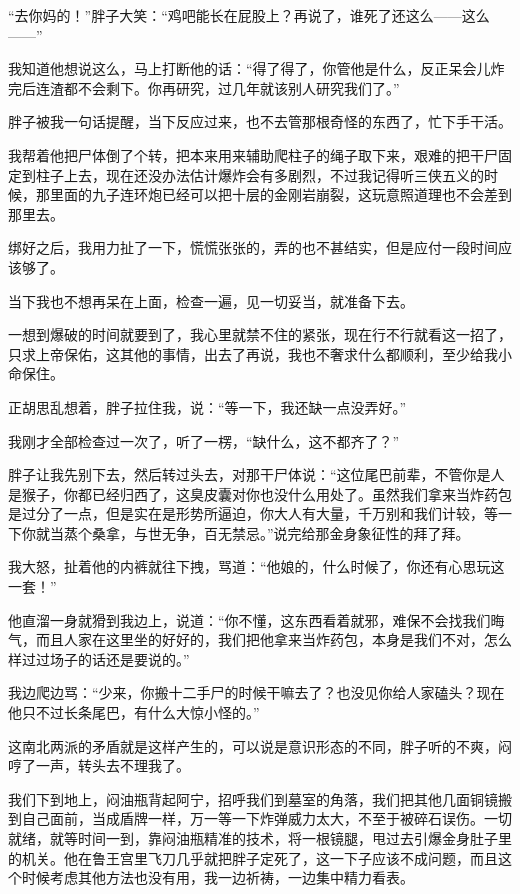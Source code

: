 “去你妈的！”胖子大笑：“鸡吧能长在屁股上？再说了，谁死了还这么——这么——”

我知道他想说这么，马上打断他的话：“得了得了，你管他是什么，反正呆会儿炸完后连渣都不会剩下。你再研究，过几年就该别人研究我们了。”

胖子被我一句话提醒，当下反应过来，也不去管那根奇怪的东西了，忙下手干活。

我帮着他把尸体倒了个转，把本来用来辅助爬柱子的绳子取下来，艰难的把干尸固定到柱子上去，现在还没办法估计爆炸会有多剧烈，不过我记得听三侠五义的时候，那里面的九子连环炮已经可以把十层的金刚岩崩裂，这玩意照道理也不会差到那里去。

绑好之后，我用力扯了一下，慌慌张张的，弄的也不甚结实，但是应付一段时间应该够了。

当下我也不想再呆在上面，检查一遍，见一切妥当，就准备下去。

一想到爆破的时间就要到了，我心里就禁不住的紧张，现在行不行就看这一招了，只求上帝保佑，这其他的事情，出去了再说，我也不奢求什么都顺利，至少给我小命保住。

正胡思乱想着，胖子拉住我，说：“等一下，我还缺一点没弄好。”

我刚才全部检查过一次了，听了一楞，“缺什么，这不都齐了？”

胖子让我先别下去，然后转过头去，对那干尸体说：“这位尾巴前辈，不管你是人是猴子，你都已经归西了，这臭皮囊对你也没什么用处了。虽然我们拿来当炸药包是过分了一点，但是实在是形势所逼迫，你大人有大量，千万别和我们计较，等一下你就当蒸个桑拿，与世无争，百无禁忌。”说完给那金身象征性的拜了拜。

我大怒，扯着他的内裤就往下拽，骂道：“他娘的，什么时候了，你还有心思玩这一套！”

他直溜一身就猾到我边上，说道：“你不懂，这东西看着就邪，难保不会找我们晦气，而且人家在这里坐的好好的，我们把他拿来当炸药包，本身是我们不对，怎么样过过场子的话还是要说的。”

我边爬边骂：“少来，你搬十二手尸的时候干嘛去了？也没见你给人家磕头？现在他只不过长条尾巴，有什么大惊小怪的。”

这南北两派的矛盾就是这样产生的，可以说是意识形态的不同，胖子听的不爽，闷哼了一声，转头去不理我了。

我们下到地上，闷油瓶背起阿宁，招呼我们到墓室的角落，我们把其他几面铜镜搬到自己面前，当成盾牌一样，万一等一下炸弹威力太大，不至于被碎石误伤。一切就绪，就等时间一到，靠闷油瓶精准的技术，将一根镜腿，甩过去引爆金身肚子里的机关。他在鲁王宫里飞刀几乎就把胖子定死了，这一下子应该不成问题，而且这个时候考虑其他方法也没有用，我一边祈祷，一边集中精力看表。


